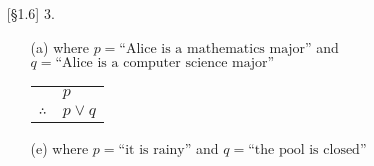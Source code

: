 \documentclass{article}
\begin{document}
\begin{enumerate}
    \item[{[\S 1.6]} 3.]
    \begin{itemize}
        \item[(a)]  where $p = \textrm{``Alice is a mathematics major''}$ and $q = \textrm{``Alice is a computer science major''}$

                    \begin{tabular}{cl}
                    & $p$ \\\cline{2-2}
                    $\therefore$ & $p \lor q$
                    \end{tabular}
        \item[(e)]  where $p = \textrm{``it is rainy''}$ and $q = \textrm{``the pool is closed''}$


\end{itemize}
\end{enumerate}
\end{document}
